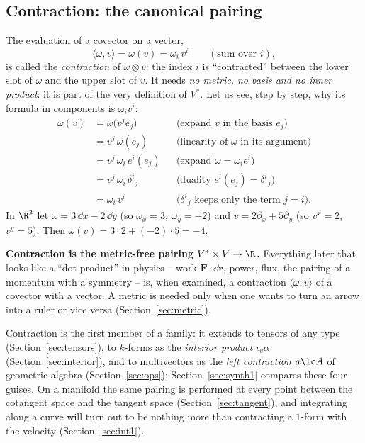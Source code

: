 \subsection{Contraction: the canonical pairing}\label{sec:contraction}

The evaluation of a covector on a vector,
\begin{equation}\label{eq:pairing}
\langle\omega,v\rangle=\omega(v)=\omega_i\,v^i\qquad(\text{sum over }i),
\end{equation}
is called the \emph{contraction} of $\omega\otimes v$: the index $i$ is ``contracted'' between the lower slot of $\omega$ and the
upper slot of $v$. It needs \emph{no metric, no basis and no inner product}: it is part of the very definition of $V^*$.
Let us see, step by step, why its formula in components is $\omega_iv^i$:
\begin{align*}
\omega(v)&=\omega\bigl(v^je_j\bigr) &&\text{(expand $v$ in the basis $e_j$)}\\
&=v^j\,\omega(e_j) &&\text{(linearity of $\omega$ in its argument)}\\
&=v^j\,\omega_i\,e^i(e_j) &&\text{(expand $\omega=\omega_ie^i$)}\\
&=v^j\,\omega_i\,\delta^i{}_j &&\text{(duality $e^i(e_j)=\delta^i{}_j$)}\\
&=\omega_i\,v^i &&\text{($\delta^i{}_j$ keeps only the term $j=i$).}
\end{align*}
\numcheck In $\R^2$ let $\omega=3\,\dd x-2\,\dd y$ (so $\omega_x=3$, $\omega_y=-2$) and $v=2\partial_x+5\partial_y$
(so $v^x=2$, $v^y=5$). Then $\omega(v)=3\cdot2+(-2)\cdot5=-4$.



\begin{keyidea}
\textbf{Contraction is the metric-free pairing $V^*\times V\to\R$.} Everything later that looks like a ``dot product'' in physics
-- work $\mathbf F\cdot\dd\mathbf r$, power, flux, the pairing of a momentum with a symmetry -- is, when examined, a contraction
$\langle\omega,v\rangle$ of a covector with a vector. A metric is needed only when one wants to turn an arrow into a ruler or
vice versa (Section~\ref{sec:metric}).
\end{keyidea}

Contraction is the first member of a family: it extends to tensors of any type (Section~\ref{sec:tensors}), to
$k$-forms as the \emph{interior product} $\iota_v\alpha$ (Section~\ref{sec:interior}), and to multivectors as the
\emph{left contraction} $a\lc A$ of geometric algebra (Section~\ref{sec:ops}); Section~\ref{sec:synth1} compares these four
guises. On a manifold the same pairing is performed at every point between the cotangent space and the tangent space
(Section~\ref{sec:tangent}), and integrating along a curve will turn out to be nothing more than contracting a $1$-form with the
velocity (Section~\ref{sec:int1}).
